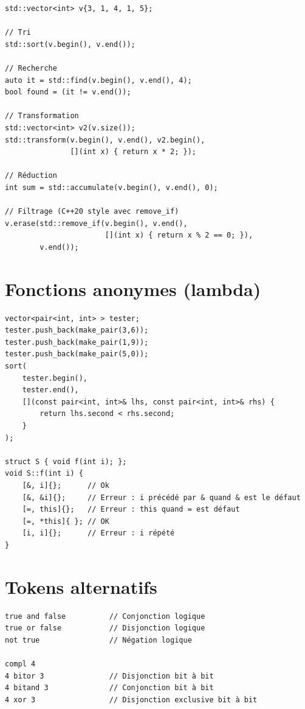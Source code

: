 \documentclass{article}
\begin{document}
\begin{multicols*}{3}
\begin{lstlisting}
std::vector<int> v{3, 1, 4, 1, 5};

// Tri
std::sort(v.begin(), v.end());

// Recherche
auto it = std::find(v.begin(), v.end(), 4);
bool found = (it != v.end());

// Transformation
std::vector<int> v2(v.size());
std::transform(v.begin(), v.end(), v2.begin(), 
               [](int x) { return x * 2; });

// Réduction
int sum = std::accumulate(v.begin(), v.end(), 0);

// Filtrage (C++20 style avec remove_if)
v.erase(std::remove_if(v.begin(), v.end(), 
                       [](int x) { return x % 2 == 0; }), 
        v.end());

\end{lstlisting}

    \section*{Fonctions anonymes (lambda)}

    \begin{lstlisting}
vector<pair<int, int> > tester;
tester.push_back(make_pair(3,6));
tester.push_back(make_pair(1,9));
tester.push_back(make_pair(5,0));
sort(
    tester.begin(),
    tester.end(),
    [](const pair<int, int>& lhs, const pair<int, int>& rhs) {
        return lhs.second < rhs.second;
    }
);

struct S { void f(int i); };
void S::f(int i) {
    [&, i]{};      // Ok
    [&, &i]{};     // Erreur : i précédé par & quand & est le défaut
    [=, this]{};   // Erreur : this quand = est défaut
    [=, *this]{ }; // OK
    [i, i]{};      // Erreur : i répété
}
\end{lstlisting}

    \section*{Tokens alternatifs}

    \begin{lstlisting}
true and false          // Conjonction logique
true or false           // Disjonction logique
not true                // Négation logique

compl 4
4 bitor 3               // Disjonction bit à bit
4 bitand 3              // Conjonction bit à bit
4 xor 3                 // Disjonction exclusive bit à bit
\end{lstlisting}


\end{multicols*}
\end{document}
